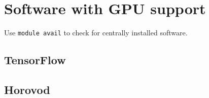




\section{Software with GPU support}
\label{sec:gpu_ugent_software}

Use \lstinline|module avail| to check for centrally installed software.





\subsection{TensorFlow}
\label{sec:gpu_ugent_software_tensorflow}









\subsection{Horovod}
\label{sec:gpu_ugent_software_horovod}

